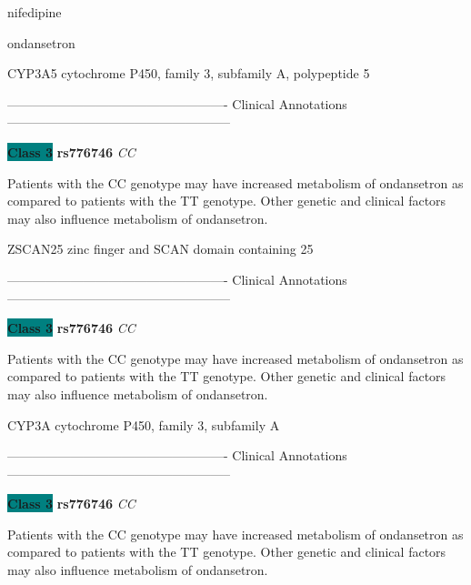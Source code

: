 \documentclass{resume} %
\begin{document}
\begin{rSection}{ nifedipine }
\end{rSection}\begin{rSection}{ ondansetron }
\item[]

\begin{rSubsection}{ CYP3A5 }{ cytochrome P450, family 3, subfamily A, polypeptide 5 }{}{}
\item[]

\item[] ---------------------------------------------------- Clinical Annotations -----------------------------------------------------\newline
\item \textbf{\colorbox{teal} {Class 3}} \textbf{ rs776746 } \textit{ CC }
\item[] Patients with the CC genotype may have increased metabolism of ondansetron as compared to patients with the TT genotype. Other genetic and clinical factors may also influence metabolism of ondansetron.
\end{rSubsection}\begin{rSubsection}{ ZSCAN25 }{ zinc finger and SCAN domain containing 25 }{}{}
\item[]

\item[] ---------------------------------------------------- Clinical Annotations -----------------------------------------------------\newline
\item \textbf{\colorbox{teal} {Class 3}} \textbf{ rs776746 } \textit{ CC }
\item[] Patients with the CC genotype may have increased metabolism of ondansetron as compared to patients with the TT genotype. Other genetic and clinical factors may also influence metabolism of ondansetron.
\end{rSubsection}\begin{rSubsection}{ CYP3A }{ cytochrome P450, family 3, subfamily A }{}{}
\item[]

\item[] ---------------------------------------------------- Clinical Annotations -----------------------------------------------------\newline
\item \textbf{\colorbox{teal} {Class 3}} \textbf{ rs776746 } \textit{ CC }
\item[] Patients with the CC genotype may have increased metabolism of ondansetron as compared to patients with the TT genotype. Other genetic and clinical factors may also influence metabolism of ondansetron.
\end{rSubsection}


\end{rSection}
\end{document}
